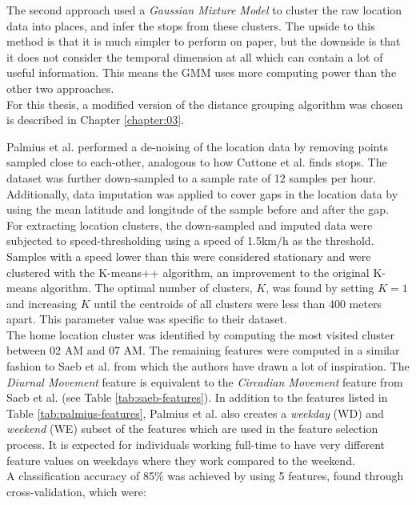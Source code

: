 The second approach used a \textit{Gaussian Mixture Model} to cluster the raw location data into places, and infer the stops from these clusters. The upside to this method is that it is much simpler to perform on paper, but the downside is that it does not consider the temporal dimension at all which can contain a lot of useful information. This means the GMM uses more computing power than the other two approaches. \\

For this thesis, a modified version of the distance grouping algorithm was chosen is described in Chapter \ref{chapter:03}.

Palmius et al. performed a de-noising of the location data by removing points sampled close to each-other, analogous to how Cuttone et al. finds stops. The dataset was further down-sampled to a sample rate of 12 samples per hour. Additionally, data imputation was applied to cover gaps in the location data by using the mean latitude and longitude of the sample before and after the gap. \\

For extracting location clusters, the down-sampled and imputed data were subjected to speed-thresholding using a speed of 1.5km/h as the threshold. Samples with a speed lower than this were considered stationary and were clustered with the K-means++ algorithm, an improvement to the original K-means algorithm. The optimal number of clusters, $K$, was found by setting $K=1$ and increasing $K$ until the centroids of all clusters were less than 400 meters apart. This parameter value was specific to their dataset.\\

The home location cluster was identified by computing the most visited cluster between 02 AM and 07 AM. The remaining features were computed in a similar fashion to Saeb et al. from which the authors have drawn a lot of inspiration. The \textit{Diurnal Movement} feature is equivalent to the \textit{Circadian Movement }feature from Saeb et al. (see Table \ref{tab:saeb-features}). In addition to the features listed in Table \ref{tab:palmius-features}, Palmius et al. also creates a \textit{weekday} (WD) and \textit{weekend} (WE) subset of the features which are used in the feature selection process. It is expected for individuals working full-time to have very different feature values on weekdays where they work compared to the weekend.\\

A classification accuracy of 85\% was achieved by using 5 features, found through cross-validation, which were:

